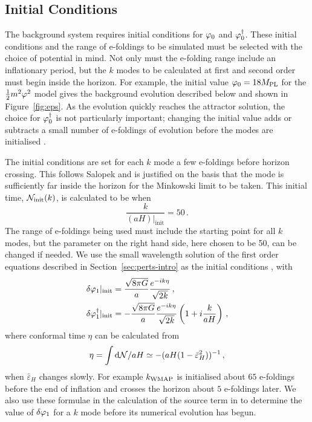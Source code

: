 \subsection{Initial Conditions} 
\label{sec:initconds-num}

The background system requires initial conditions for $\varphi_{0}$ and
$\varphi_{0}^{\dagger}$. These initial conditions and the range of
e-foldings to be simulated must be selected with the choice of
potential in mind. Not only must the
e-folding range include an inflationary period, but the $k$ modes to
be calculated at first and second order must begin inside the horizon. For example,
the initial value $\varphi_0 = 18M_{\mathrm{PL}}$ for the
$\frac{1}{2} m^2 \varphi^2$ model 
gives the background evolution described below and shown in Figure~\ref{fig:eps}. As
the evolution quickly reaches the attractor solution, the choice for $\varphi_0^{\dagger}$
is not particularly important; changing the initial value adds or subtracts a small
number of e-foldings of evolution before the modes are initialised
\cite{Ringeval:2007am, Martin:2006rs}.


The initial conditions are set for each $k$ mode a few e-foldings
before horizon crossing. This follows Salopek
\etal
\cite{Salopek:1988qh} and is justified on the basis that the mode is
sufficiently far inside the
horizon for the Minkowski limit to be taken. This initial time,
$\mathcal{N}_{\mathrm{init}}(k)$, is calculated to be when
%  
\begin{equation}
 \frac{k}{(aH)|_{\mathrm{init}}} = 50 \,.
\end{equation}
%
The range of e-foldings being used must include the starting point for
all $k$ modes, but the parameter on the right hand side, here chosen to
be 50, can be changed if needed.  We use the small wavelength solution
of the first order equations described in Section~\ref{sec:perts-intro} as the
initial conditions \cite{Salopek:1988qh}, with
%
\begin{align}
\label{eq:foics}
 \delta\varphi_{1}|_{\mathrm{init}} &= \frac{\sqrt{8\pi G}}{a}
\frac{e^{-i k\eta}}{\sqrt{2k}} \,,\\
 \delta\varphi_{1}^{\dagger}|_{\mathrm{init}} &= -\frac{\sqrt{8\pi G}}{a}
\frac{e^{-i k\eta}}{\sqrt{2k}} \left(1 + i \frac{k}{a H}\right) \,,
\end{align}
%
where conformal time $\eta$ can be calculated from 
% 
\begin{equation}
\label{eq:etacalc-num}
\eta=\int \mathrm{d}\mathcal{N}/aH \simeq
-(aH(1-\bar{\varepsilon}^2_H))^{-1}\,,
\end{equation} 
% 
when $\bar{\varepsilon}_H$ changes slowly. For
example $k_\mathrm{WMAP}$ is initialised
about $65$ e-foldings before the end of inflation and crosses the horizon about $5$ e-foldings
later.
We also use these formulae in the calculation of the source term in  to
determine the value of $\delta\varphi_{1}$ for a $k$ mode before its numerical evolution has
begun.


